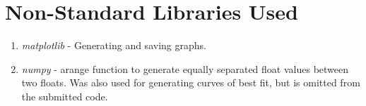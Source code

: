 \documentclass[12pt, twoside]{article}
\begin{document}
\section{Non-Standard Libraries Used}

\begin{enumerate}
    \item
        \textit{matplotlib} - Generating and saving graphs.
    \item
        \textit{numpy} - arange function to generate equally separated float values between two floats.
        Was also used for generating curves of best fit, but is omitted from the submitted code.
\end{enumerate}
 
\end{document}

